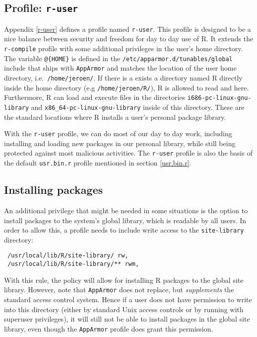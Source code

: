\documentclass{jss}
\newcommand{\R}{\textsf{R}\xspace}
\newcommand{\AppArmor}{\texttt{AppArmor}\xspace}
\begin{document}
\subsection[Profile: r-user]{Profile: \texttt{r-user}}

Appendix \ref{r-user} defines a profile named \texttt{r-user}. This profile is
designed to be a nice balance between security and freedom for day to day use
of R. It extends the \texttt{r-compile} profile with some additional privileges
in the user's home directory. The variable \texttt{@\{HOME\}} is defined in the
\texttt{/etc/apparmor.d/tunables/global} include that ships with \AppArmor and
matches the location of the user home directory, i.e.\ \texttt{/home/jeroen/}.
If there is a exists a directory named \R directly inside the home directory
(e.g \texttt{/home/jeroen/R/}), \R is allowed to read and here. Furthermore, \R
can load and execute files in the directories \texttt{i686-pc-linux-gnu-library}
and \texttt{x86\_64-pc-linux-gnu-library} inside of this directory. These are
the standard locations where \R installs a user's personal package library.

With the \texttt{r-user} profile, we can do most of our day to day work,
including installing and loading new packages in our personal library, while
still being protected against most malicious activities. The \texttt{r-user}
profile is also the basis of the default \texttt{usr.bin.r} profile mentioned
in section \ref{usr.bin.r}.

\subsection{Installing packages}

An additional privilege that might be needed in some situations is the option
to install packages to the system's global library, which is readable by all
users. In order to allow this, a profile needs to include write access to the
\texttt{site-library} directory:

\begin{verbatim}
 /usr/local/lib/R/site-library/ rw,
 /usr/local/lib/R/site-library/** rwm,
\end{verbatim}

With this rule, the policy will allow for installing \R packages to the global
site library. However, note that \AppArmor does not replace, but
\emph{supplements} the standard access control system. Hence if a user does not
have permission to write into this directory (either by standard Unix access
controls or by running with superuser privileges), it will still not be able to
install packages in the global site library, even though the \AppArmor profile
does grant this permission.
\end{document}
